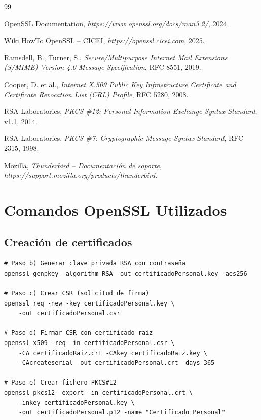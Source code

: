 \documentclass[12pt,a4paper]{report}
\begin{document}
\begin{thebibliography}{99}

 OpenSSL Documentation, \textit{https://www.openssl.org/docs/man3.2/}, 2024.

 Wiki HowTo OpenSSL -- CICEI, \textit{https://openssl.cicei.com}, 2025.

 Ramsdell, B., Turner, S., \textit{Secure/Multipurpose Internet Mail Extensions (S/MIME) Version 4.0 Message Specification}, RFC 8551, 2019.

 Cooper, D. et al., \textit{Internet X.509 Public Key Infrastructure Certificate and Certificate Revocation List (CRL) Profile}, RFC 5280, 2008.

 RSA Laboratories, \textit{PKCS \#12: Personal Information Exchange Syntax Standard}, v1.1, 2014.

 RSA Laboratories, \textit{PKCS \#7: Cryptographic Message Syntax Standard}, RFC 2315, 1998.

 Mozilla, \textit{Thunderbird -- Documentación de soporte}, \textit{https://support.mozilla.org/products/thunderbird}.

\end{thebibliography}


\appendix

\chapter{Comandos OpenSSL Utilizados}

\section{Creación de certificados}

\begin{lstlisting}[caption=Comandos para creación del certificado personal]
# Paso b) Generar clave privada RSA con contraseña
openssl genpkey -algorithm RSA -out certificadoPersonal.key -aes256

# Paso c) Crear CSR (solicitud de firma)
openssl req -new -key certificadoPersonal.key \
    -out certificadoPersonal.csr

# Paso d) Firmar CSR con certificado raiz
openssl x509 -req -in certificadoPersonal.csr \
    -CA certificadoRaiz.crt -CAkey certificadoRaiz.key \
    -CAcreateserial -out certificadoPersonal.crt -days 365

# Paso e) Crear fichero PKCS#12
openssl pkcs12 -export -in certificadoPersonal.crt \
    -inkey certificadoPersonal.key \
    -out certificadoPersonal.p12 -name "Certificado Personal"
\end{lstlisting}
\end{document}
